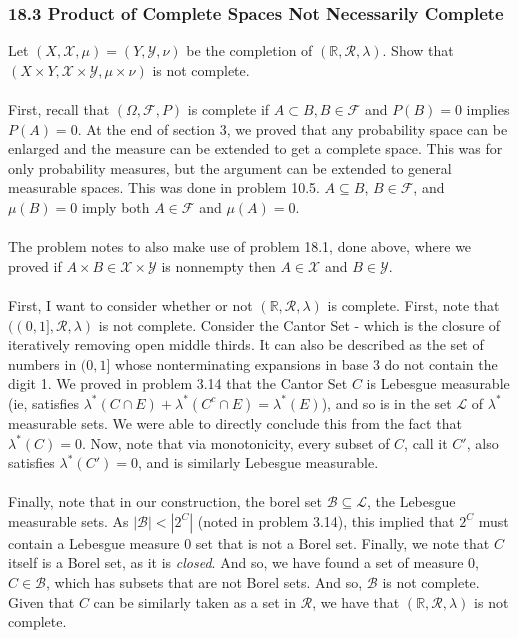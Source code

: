 \documentclass[12pt,a4paper]{article}
\newcommand{\1}[1]{\mathbbm{1}\left\{ #1 \right\}}
\newcommand{\R}{\mathbb{R}}
\newcommand{\lcal}{\mathcal{L}}
\newcommand{\fcal}{\mathcal{F}}
\newcommand{\bcal}{\mathcal{B}}
\newcommand{\rcal}{\mathcal{R}}
\newcommand{\xcal}{\mathcal{X}}
\newcommand{\ycal}{\mathcal{Y}}
\begin{document}
\subsubsection{18.3 Product of Complete Spaces Not Necessarily Complete} Let $(X, \xcal, \mu) = (Y, \ycal, \nu)$ be the completion of $(\R, \rcal, \lambda)$. Show that $(X \times Y, \xcal \times \ycal, \mu \times \nu)$ is not complete.
\\\\
First, recall that $(\Omega, \fcal, P)$ is complete if $A \subset B, B \in \fcal$ and $P(B) = 0$ implies $P(A) = 0$. At the end of section 3, we proved that any probability space can be enlarged and the measure can be extended to get a complete space. This was for only probability measures, but the argument can be extended to general measurable spaces. This was done in problem 10.5. $A \subseteq B$, $B \in \fcal$, and $\mu(B) = 0$ imply both $A \in \fcal$ and $\mu(A) = 0$.
\\\\
The problem notes to also make use of problem 18.1, done above, where we proved if $A \times B \in \xcal \times \ycal$ is nonnempty then $A \in \xcal$ and $B \in \ycal$.
\\\\
First, I want to consider whether or not $(\R, \rcal, \lambda)$ is complete. First, note that $((0,1], \rcal, \lambda)$ is not complete. Consider the Cantor Set - which is the closure of iteratively removing open middle thirds. It can also be described as the set of numbers in $(0,1]$ whose nonterminating expansions in base 3 do not contain the digit 1. We proved in problem 3.14 that the Cantor Set $C$ is Lebesgue measurable (ie, satisfies $\lambda^*(C \cap E) + \lambda^*(C^c \cap E) = \lambda^*(E)$), and so is in the set $\lcal$ of $\lambda^*$ measurable sets. We were able to directly conclude this from the fact that $\lambda^*(C) = 0$. Now, note that via monotonicity, every subset of $C$, call it $C'$, also satisfies $\lambda^*(C') = 0$, and is similarly Lebesgue measurable.
\\\\
Finally, note that in our construction, the borel set $\bcal \subseteq \lcal$, the Lebesgue measurable sets. As $|\bcal| < |2^C|$ (noted in problem 3.14), this implied that $2^C$ must contain a Lebesgue measure $0$ set that is not a Borel set. Finally, we note that $C$ itself is a Borel set, as it is \textit{closed}. And so, we have found a set of measure $0$, $C \in \bcal$, which has subsets that are not Borel sets. And so, $\bcal$ is not complete. Given that $C$ can be similarly taken as a set in $\rcal$, we have that $(\R, \rcal, \lambda)$ is not complete.
\end{document}
